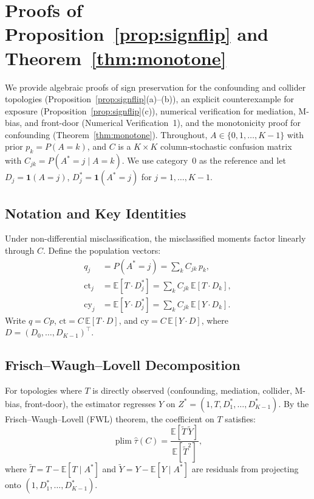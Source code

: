 \section{Proofs of Proposition~\ref{prop:signflip} and Theorem~\ref{thm:monotone}}
\label{app:proof}

We provide algebraic proofs of sign preservation for the confounding and collider topologies (Proposition~\ref{prop:signflip}(a)--(b)), an explicit counterexample for exposure (Proposition~\ref{prop:signflip}(c)), numerical verification for mediation, M-bias, and front-door (Numerical Verification~1), and the monotonicity proof for confounding (Theorem~\ref{thm:monotone}).
Throughout, $A\in\{0,1,\dots,K{-}1\}$ with prior $p_k=P(A{=}k)$, and $C$ is a $K{\times}K$ column-stochastic confusion matrix with $C_{jk}=P(A^*{=}j\mid A{=}k)$.
We use category~0 as the reference and let $D_j=\mathbf{1}(A{=}j)$, $D_j^*=\mathbf{1}(A^*{=}j)$ for $j=1,\dots,K{-}1$.

\subsection{Notation and Key Identities}
\label{app:notation}

Under non-differential misclassification, the misclassified moments factor linearly through $C$.
Define the population vectors:
\begin{align}
  q_j &= P(A^*{=}j) = \textstyle\sum_k C_{jk}\,p_k, \label{eq:q}\\
  \mathrm{ct}_j &= \mathbb{E}[T\cdot D_j^*] = \textstyle\sum_k C_{jk}\,\mathbb{E}[T\cdot D_k], \label{eq:ct}\\
  \mathrm{cy}_j &= \mathbb{E}[Y\cdot D_j^*] = \textstyle\sum_k C_{jk}\,\mathbb{E}[Y\cdot D_k]. \label{eq:cy}
\end{align}
Write $q = Cp$, $\mathrm{ct} = C\,\mathbb{E}[T\cdot D]$, and $\mathrm{cy} = C\,\mathbb{E}[Y\cdot D]$, where $D=(D_0,\dots,D_{K-1})^\top$.

\subsection{Frisch--Waugh--Lovell Decomposition}
\label{app:fwl}

For topologies where $T$ is directly observed (confounding, mediation, collider, M-bias, front-door), the estimator regresses $Y$ on $Z^*=(1,T,D_1^*,\dots,D_{K-1}^*)$.
By the Frisch--Waugh--Lovell (FWL) theorem, the coefficient on $T$ satisfies:
\begin{equation}
  \operatorname{plim}\hat{\tau}(C)
  = \frac{\mathbb{E}[\tilde{T}\,\tilde{Y}]}{\mathbb{E}[\tilde{T}^2]},
  \label{eq:fwl}
\end{equation}
where $\tilde{T}=T-\mathbb{E}[T\mid A^*]$ and $\tilde{Y}=Y-\mathbb{E}[Y\mid A^*]$ are residuals from projecting onto $(1,D_1^*,\dots,D_{K-1}^*)$.

